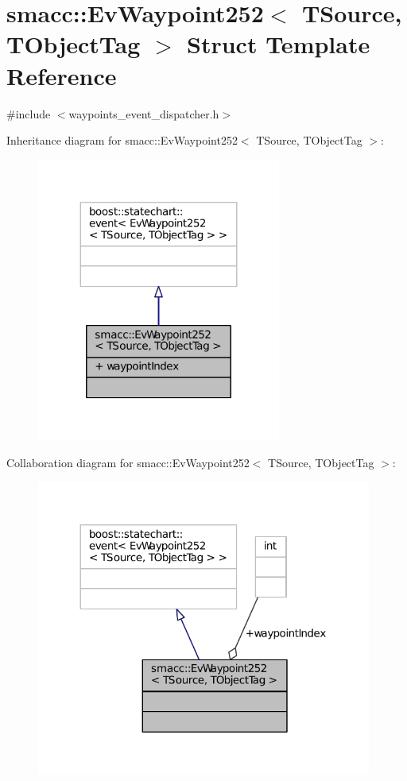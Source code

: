 \hypertarget{structsmacc_1_1EvWaypoint252}{}\section{smacc\+:\+:Ev\+Waypoint252$<$ T\+Source, T\+Object\+Tag $>$ Struct Template Reference}
\label{structsmacc_1_1EvWaypoint252}


{\ttfamily \#include $<$waypoints\+\_\+event\+\_\+dispatcher.\+h$>$}



Inheritance diagram for smacc\+:\+:Ev\+Waypoint252$<$ T\+Source, T\+Object\+Tag $>$\+:
\nopagebreak
\begin{figure}[H]
\begin{center}
\leavevmode
\includegraphics[width=227pt]{structsmacc_1_1EvWaypoint252__inherit__graph}
\end{center}
\end{figure}


Collaboration diagram for smacc\+:\+:Ev\+Waypoint252$<$ T\+Source, T\+Object\+Tag $>$\+:
\nopagebreak
\begin{figure}[H]
\begin{center}
\leavevmode
\includegraphics[width=312pt]{structsmacc_1_1EvWaypoint252__coll__graph}
\end{center}
\end{figure}
